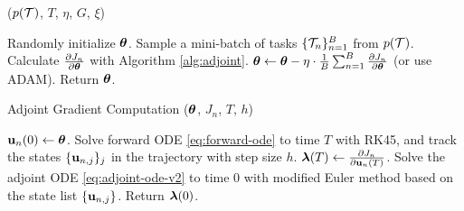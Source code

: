 \begin{algorithm}                  %
	\small
	\caption{\ours ($p(\mathcal{T})$, $T$, $\eta$, $G$, $\xi$)}          
	\label{alg:amaml}                           
	\begin{algorithmic}[1]                    %
		\STATE Randomly initialize $\boldsymbol{\theta}$.
		\REPEAT 
		\STATE Sample a mini-batch of tasks $\{\mathcal{T}_n\}_{n=1}^B$ from $p(\mathcal{T})$.
		\STATE Calculate $\frac{\partial J_n}{\partial \boldsymbol{\theta}}$ with Algorithm \ref{alg:adjoint}.
		\ENDFOR
		\STATE $\boldsymbol{\theta} \leftarrow \boldsymbol{\theta} - \eta \cdot \frac{1}{B} \sum_{n=1}^B \frac{\partial J_n}{\partial \boldsymbol{\theta}}$ (or use ADAM).
		\STATE Return $\boldsymbol{\theta}$. 
	\end{algorithmic}
\end{algorithm}
\begin{algorithm}
	\small 
	\caption{Adjoint Gradient Computation ($\boldsymbol{\theta}$, $J_n$, $T$, $h$)}          
	\label{alg:adjoint}                           
	\begin{algorithmic} [1]                  %
		\STATE ${\bf u}_n(0) \leftarrow \boldsymbol{\theta}$.
		\STATE Solve forward ODE \eqref{eq:forward-ode} to time $T$ with RK45, and track the states $\{{\bf u}_{n,j}\}_j$ in the trajectory with step size $h$.
		\STATE $\boldsymbol{\lambda}(T) \leftarrow \frac{\partial J_n}{\partial {\bf u}_n(T)}$.
		\STATE Solve the adjoint ODE \eqref{eq:adjoint-ode-v2} to time $0$ with modified Euler method based on the state list $\{{\bf u}_{n,j}\}$.
		\STATE Return  $\boldsymbol{\lambda}(0)$.
	\end{algorithmic}
\end{algorithm}

